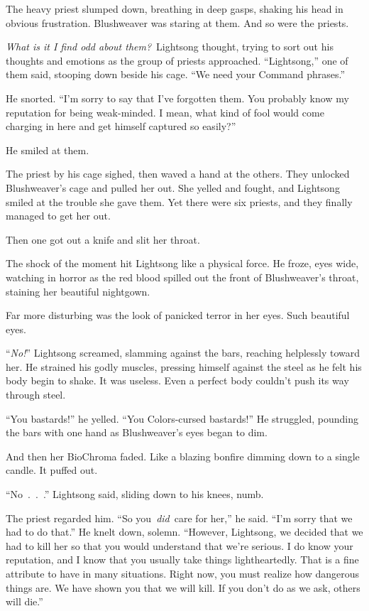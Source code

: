 The heavy priest slumped down, breathing in deep gasps, shaking his head in obvious frustration. Blushweaver was staring at them. And so were the priests.

\textit{What is it I find odd about them?}~Lightsong thought, trying to sort out his thoughts and emotions as the group of priests approached. “Lightsong,” one of them said, stooping down beside his cage. “We need your Command phrases.”

He snorted. “I’m sorry to say that I’ve forgotten them. You probably know my reputation for being weak-minded. I mean, what kind of fool would come charging in here and get himself captured so easily?”

He smiled at them.

The priest by his cage sighed, then waved a hand at the others. They unlocked Blushweaver’s cage and pulled her out. She yelled and fought, and Lightsong smiled at the trouble she gave them. Yet there were six priests, and they finally managed to get her out.

Then one got out a knife and slit her throat.

The shock of the moment hit Lightsong like a physical force. He froze, eyes wide, watching in horror as the red blood spilled out the front of Blushweaver’s throat, staining her beautiful nightgown.

Far more disturbing was the look of panicked terror in her eyes. Such beautiful eyes.

“\textit{No!}” Lightsong screamed, slamming against the bars, reaching helplessly toward her. He strained his godly muscles, pressing himself against the steel as he felt his body begin to shake. It was useless. Even a perfect body couldn’t push its way through steel.

“You bastards!” he yelled. “You Colors-cursed bastards!” He struggled, pounding the bars with one hand as Blushweaver’s eyes began to dim.

And then her BioChroma faded. Like a blazing bonfire dimming down to a single candle. It puffed out.

“No~.~.~.” Lightsong said, sliding down to his knees, numb.

The priest regarded him. “So you~\textit{did}~care for her,” he said. “I’m sorry that we had to do that.” He knelt down, solemn. “However, Lightsong, we decided that we had to kill her so that you would understand that we’re serious. I do know your reputation, and I know that you usually take things lightheartedly. That is a fine attribute to have in many situations. Right now, you must realize how dangerous things are. We have shown you that we will kill. If you don’t do as we ask, others will die.”


